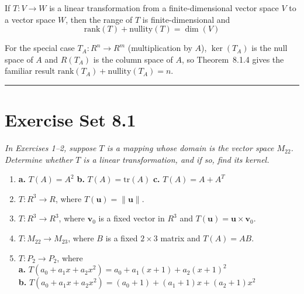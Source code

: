 \documentclass{article}
\begin{document}
\begin{tcolorbox}[colback=red!4, colframe=red!60!black,
  title={\textbf{Theorem 8.1.4 --- Dimension Theorem for Linear Transformations}},
  boxrule=0.5mm, arc=3mm]
If $T : V \to W$ is a linear transformation from a finite-dimensional vector space $V$
to a vector space $W$, then the range of $T$ is finite-dimensional and
\begin{equation}
  \text{rank}(T) + \text{nullity}(T) = \dim(V) \tag{7}
\end{equation}
\end{tcolorbox}

For the special case $T_A : R^n \to R^m$ (multiplication by $A$), $\ker(T_A)$ is the null
space of $A$ and $R(T_A)$ is the column space of $A$, so Theorem~8.1.4 gives the familiar
result $\text{rank}(T_A) + \text{nullity}(T_A) = n$.

\vspace{3mm}
\noindent\rule{\linewidth}{0.5pt}

\section*{Exercise Set 8.1}

\noindent\textit{In Exercises 1--2, suppose $T$ is a mapping whose domain is the vector
space $M_{22}$. Determine whether $T$ is a linear transformation, and if so, find its kernel.}

\begin{enumerate}

  \item \textbf{a.} $T(A) = A^2$ \quad \textbf{b.} $T(A) = \mathrm{tr}(A)$ \quad
        \textbf{c.} $T(A) = A + A^T$

  \item[3.] $T : R^3 \to R$, where $T(\mathbf{u}) = \|\mathbf{u}\|$.

  \item[4.] $T : R^3 \to R^3$, where $\mathbf{v}_0$ is a fixed vector in $R^3$ and
        $T(\mathbf{u}) = \mathbf{u}\times\mathbf{v}_0$.

  \item[5.] $T : M_{22} \to M_{23}$, where $B$ is a fixed $2\times 3$ matrix and $T(A) = AB$.

  \item[7.] $T : P_2 \to P_2$, where \\
        \textbf{a.} $T(a_0+a_1x+a_2x^2) = a_0 + a_1(x+1) + a_2(x+1)^2$\\
        \textbf{b.} $T(a_0+a_1x+a_2x^2) = (a_0+1)+(a_1+1)x+(a_2+1)x^2$

\end{enumerate}
\end{document}
